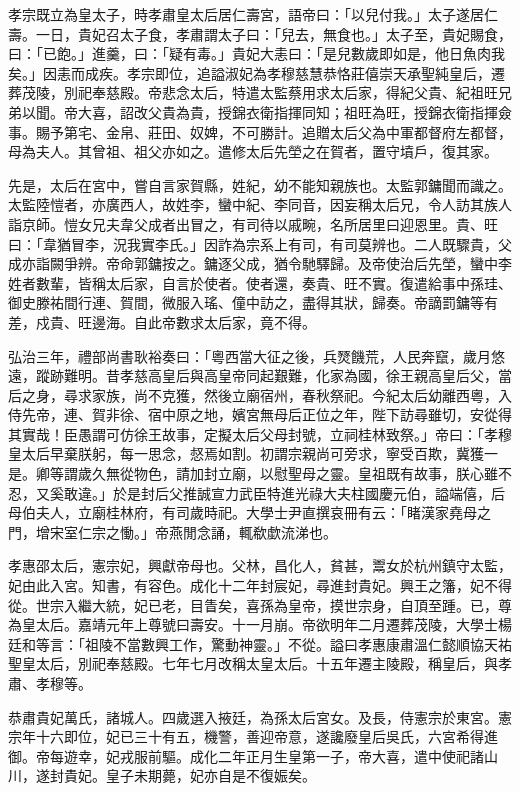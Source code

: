 孝宗既立為皇太子，時孝肅皇太后居仁壽宮，語帝曰：「以兒付我。」太子遂居仁壽。一日，貴妃召太子食，孝肅謂太子曰：「兒去，無食也。」太子至，貴妃賜食，曰：「已飽。」進羹，曰：「疑有毒。」貴妃大恚曰：「是兒數歲即如是，他日魚肉我矣。」因恚而成疾。孝宗即位，追謚淑妃為孝穆慈慧恭恪莊僖崇天承聖純皇后，遷葬茂陵，別祀奉慈殿。帝悲念太后，特遣太監蔡用求太后家，得紀父貴、紀祖旺兄弟以聞。帝大喜，詔改父貴為貴，授錦衣衛指揮同知；祖旺為旺，授錦衣衛指揮僉事。賜予第宅、金帛、莊田、奴婢，不可勝計。追贈太后父為中軍都督府左都督，母為夫人。其曾祖、祖父亦如之。遣修太后先塋之在賀者，置守墳戶，復其家。

先是，太后在宮中，嘗自言家賀縣，姓紀，幼不能知親族也。太監郭鏞聞而識之。太監陸愷者，亦廣西人，故姓李，蠻中紀、李同音，因妄稱太后兄，令人訪其族人詣京師。愷女兄夫韋父成者出冒之，有司待以戚畹，名所居里曰迎恩里。貴、旺曰：「韋猶冒李，況我實李氏。」因詐為宗系上有司，有司莫辨也。二人既驟貴，父成亦詣闕爭辨。帝命郭鏞按之。鏞逐父成，猶令馳驛歸。及帝使治后先塋，蠻中李姓者數輩，皆稱太后家，自言於使者。使者還，奏貴、旺不實。復遣給事中孫珪、御史滕祐間行連、賀間，微服入瑤、僮中訪之，盡得其狀，歸奏。帝謫罰鏞等有差，戍貴、旺邊海。自此帝數求太后家，竟不得。

弘治三年，禮部尚書耿裕奏曰：「粵西當大征之後，兵燹饑荒，人民奔竄，歲月悠遠，蹤跡難明。昔孝慈高皇后與高皇帝同起艱難，化家為國，徐王親高皇后父，當后之身，尋求家族，尚不克獲，然後立廟宿州，春秋祭祀。今紀太后幼離西粵，入侍先帝，連、賀非徐、宿中原之地，嬪宮無母后正位之年，陛下訪尋雖切，安從得其實哉！臣愚謂可仿徐王故事，定擬太后父母封號，立祠桂林致祭。」帝曰：「孝穆皇太后早棄朕躬，每一思念，惄焉如割。初謂宗親尚可旁求，寧受百欺，冀獲一是。卿等謂歲久無從物色，請加封立廟，以慰聖母之靈。皇祖既有故事，朕心雖不忍，又奚敢違。」於是封后父推誠宣力武臣特進光祿大夫柱國慶元伯，謚端僖，后母伯夫人，立廟桂林府，有司歲時祀。大學士尹直撰哀冊有云：「睹漢家堯母之門，增宋室仁宗之慟。」帝燕閒念誦，輒欷歔流涕也。

孝惠邵太后，憲宗妃，興獻帝母也。父林，昌化人，貧甚，鬻女於杭州鎮守太監，妃由此入宮。知書，有容色。成化十二年封宸妃，尋進封貴妃。興王之籓，妃不得從。世宗入繼大統，妃已老，目眚矣，喜孫為皇帝，摸世宗身，自頂至踵。已，尊為皇太后。嘉靖元年上尊號曰壽安。十一月崩。帝欲明年二月遷葬茂陵，大學士楊廷和等言：「祖陵不當數興工作，驚動神靈。」不從。謚曰孝惠康肅溫仁懿順協天祐聖皇太后，別祀奉慈殿。七年七月改稱太皇太后。十五年遷主陵殿，稱皇后，與孝肅、孝穆等。

恭肅貴妃萬氏，諸城人。四歲選入掖廷，為孫太后宮女。及長，侍憲宗於東宮。憲宗年十六即位，妃已三十有五，機警，善迎帝意，遂讒廢皇后吳氏，六宮希得進御。帝每遊幸，妃戎服前驅。成化二年正月生皇第一子，帝大喜，遣中使祀諸山川，遂封貴妃。皇子未期薨，妃亦自是不復娠矣。

